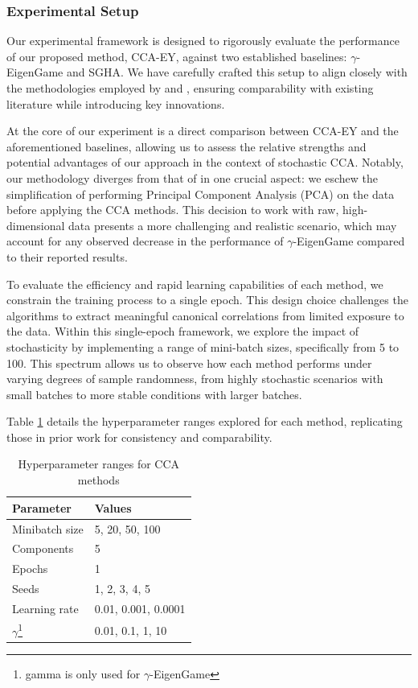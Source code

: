 \subsubsection{Experimental Setup}
Our experimental framework is designed to rigorously evaluate the performance of our proposed method, CCA-EY, against two established baselines: $\gamma$-EigenGame and SGHA. We have carefully crafted this setup to align closely with the methodologies employed by \citet{meng2021online} and \citet{gemp2022generalized}, ensuring comparability with existing literature while introducing key innovations.

At the core of our experiment is a direct comparison between CCA-EY and the aforementioned baselines, allowing us to assess the relative strengths and potential advantages of our approach in the context of stochastic CCA. Notably, our methodology diverges from that of \citet{gemp2022generalized} in one crucial aspect: we eschew the simplification of performing Principal Component Analysis (PCA) on the data before applying the CCA methods. This decision to work with raw, high-dimensional data presents a more challenging and realistic scenario, which may account for any observed decrease in the performance of $\gamma$-EigenGame compared to their reported results.

To evaluate the efficiency and rapid learning capabilities of each method, we constrain the training process to a single epoch. This design choice challenges the algorithms to extract meaningful canonical correlations from limited exposure to the data. Within this single-epoch framework, we explore the impact of stochasticity by implementing a range of mini-batch sizes, specifically from 5 to 100. This spectrum allows us to observe how each method performs under varying degrees of sample randomness, from highly stochastic scenarios with small batches to more stable conditions with larger batches.

Table \ref{tab:hyperparameters} details the hyperparameter ranges explored for each method, replicating those in prior work for consistency and comparability.

\begin{table}[h!]
    \centering
    \caption{Hyperparameter ranges for CCA methods}
    \label{tab:hyperparameters}
    \begin{tabular}{|l|l|}
        \hline
        Parameter             & Values              \\
        \hline
        Minibatch size        & 5, 20, 50, 100      \\
        Components            & 5                   \\
        Epochs                & 1                   \\
        Seeds                 & 1, 2, 3, 4, 5       \\
        Learning rate         & 0.01, 0.001, 0.0001 \\
        $\gamma$\footnote{gamma is only used for $\gamma$-EigenGame} & 0.01, 0.1, 1, 10    \\
        \hline
    \end{tabular}
\end{table}

